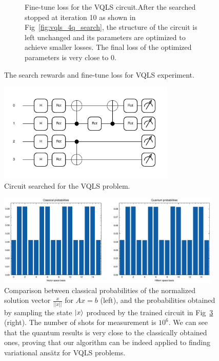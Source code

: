 \documentclass[a4paper,onecolumn,11pt]{quantumarticle}
\begin{document}
\begin{figure}[H]
\begin{subfigure}[t]{0.48\textwidth}
        \caption{Fine-tune loss for the VQLS circuit.After the searched stopped at iteration 10 as shown in Fig~\ref{fig:vqls_4q_search}, the structure of the circuit is left unchanged and its parameters are optimized to achieve smaller losses. The final loss of the optimized parameters is very close to 0.}
        \label{fig:vqls_4q_finetune}
    \end{subfigure}
    \caption{The search rewards and fine-tune loss for VQLS experiment. }\label{fig:vqls_search_finetune}
\end{figure}

\begin{figure}[H]
  \centering
  \includegraphics[width=0.75\textwidth]{Figures/fig_vqls_circ.pdf}
  \caption{Circuit searched for the VQLS problem.}
  \label{fig:vqls_circ}
\end{figure}

\begin{figure}[H]
  \centering
  \includegraphics[width=0.95\textwidth]{Figures/fig_vqls_search_results_compare.pdf}
  \caption{Comparison between classical probabilities of the normalized solution vector $\frac{x}{||x||}$ for $Ax = b$ (left), and the probabilities obtained by sampling the state $\ket{x}$ produced by the trained circuit in Fig~\ref{fig:vqls_circ} (right). The number of shots for measurement is $10^6$. We can see that the quantum results is very close to the classically obtained ones, proving that our algorithm can be indeed applied to finding variational ans\"atz for VQLS problems.}
  \label{fig:vqls_results_compare}
\end{figure}
\end{document}
